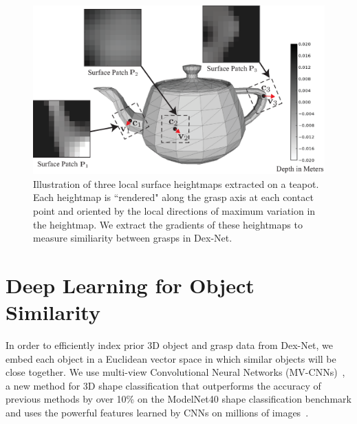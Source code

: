 \begin{figure}[t!]
\centering
\includegraphics[scale=0.325]{figures/illustrations/local_feature_model.eps}
\caption{Illustration of three local surface heightmaps extracted on a teapot. Each heightmap is ``rendered" along the grasp axis at each contact point and oriented by the local directions of maximum variation in the heightmap.  We extract the gradients of these heightmaps to measure similiarity between grasps in Dex-Net.}
\vspace*{-15pt}
\end{figure}

\section{Deep Learning for Object Similarity}
In order to efficiently index prior 3D object and grasp data from Dex-Net, we embed each object in a Euclidean vector space in which similar objects will be close together.
We use multi-view Convolutional Neural Networks (MV-CNNs)~\cite{aubry2015understanding, su2015multi}, a new method for 3D shape classification that outperforms the accuracy of previous methods by over 10\% on the ModelNet40 shape classification benchmark and uses the powerful features learned by CNNs on millions of images~\cite{krizhevsky2012imagenet}.
 
